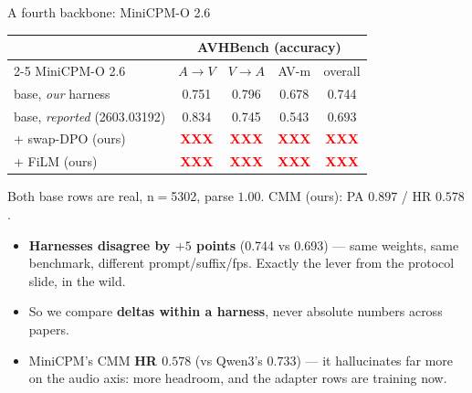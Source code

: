 \documentclass[aspectratio=169,11pt]{beamer}
\newcommand{\XXX}{\textcolor{red}{\textbf{XXX}}}
\begin{document}
\begin{frame}{A fourth backbone: MiniCPM-O 2.6}
\centering
\renewcommand{\arraystretch}{1.2}
\small
\begin{tabular}{l cccc}
\toprule
& \multicolumn{4}{c}{AVHBench (accuracy)} \\
\cmidrule(lr){2-5}
MiniCPM-O 2.6 & $A\!\to\!V$ & $V\!\to\!A$ & AV-m & overall \\
\midrule
base, \emph{our} harness   & 0.751 & 0.796 & 0.678 & 0.744 \\ %
base, \emph{reported} {\scriptsize(2603.03192)} & 0.834 & 0.745 & 0.543 & 0.693 \\ %
\midrule
+ swap-DPO (ours)      & \XXX & \XXX & \XXX & \XXX \\
+ FiLM (ours)          & \XXX & \XXX & \XXX & \XXX \\
\bottomrule
\end{tabular}
\par\vspace{0.3em}
{\scriptsize Both base rows are real, n$=$5302, parse $1.00$. CMM (ours): PA $0.897$ / HR $0.578$.}
\vfill
\begin{itemize}\small
\item \textbf{Harnesses disagree by $+5$ points} (0.744 vs 0.693) --- same weights, same benchmark,
different prompt/suffix/fps. Exactly the lever from the protocol slide, in the wild.
\item So we compare \textbf{deltas within a harness}, never absolute numbers across papers.
\item MiniCPM's CMM \textbf{HR $0.578$} (vs Qwen3's $0.733$) --- it hallucinates far more on the
audio axis: more headroom, and the adapter rows are training now.
\end{itemize}
\end{frame}
\end{document}
